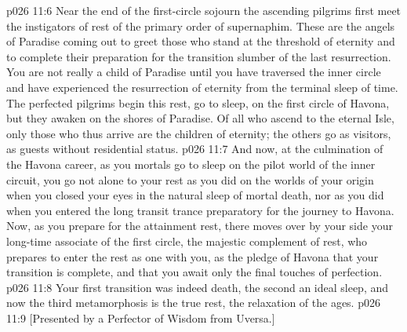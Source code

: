 \pc \vs p026 11:6 Near the end of the first\hyp{}circle sojourn the ascending pilgrims first meet the instigators of rest of the primary order of supernaphim. These are the angels of Paradise coming out to greet those who stand at the threshold of eternity and to complete their preparation for the transition slumber of the last resurrection. You are not really a child of Paradise until you have traversed the inner circle and have experienced the resurrection of eternity from the terminal sleep of time. The perfected pilgrims begin this rest, go to sleep, on the first circle of Havona, but they awaken on the shores of Paradise. Of all who ascend to the eternal Isle, only those who thus arrive are the children of eternity; the others go as visitors, as guests without residential status.
\vs p026 11:7 And now, at the culmination of the Havona career, as you mortals go to sleep on the pilot world of the inner circuit, you go not alone to your rest as you did on the worlds of your origin when you closed your eyes in the natural sleep of mortal death, nor as you did when you entered the long transit trance preparatory for the journey to Havona. Now, as you prepare for the attainment rest, there moves over by your side your long\hyp{}time associate of the first circle, the majestic complement of rest, who prepares to enter the rest as one with you, as the pledge of Havona that your transition is complete, and that you await only the final touches of perfection.
\vs p026 11:8 Your first transition was indeed death, the second an ideal sleep, and now the third metamorphosis is the true rest, the relaxation of the ages.
\vsetoff
\vs p026 11:9 [Presented by a Perfector of Wisdom from Uversa.]
